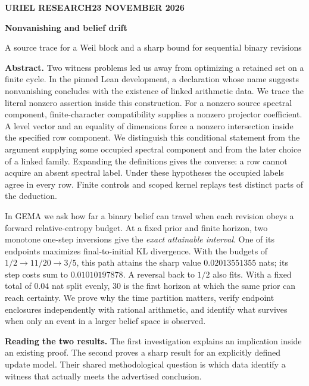 \documentclass[12pt,letterpaper]{article}
\begin{document}
\thispagestyle{plain}
{\sffamily\small\bfseries\color{accent}URIEL RESEARCH\hfill 23 NOVEMBER 2026}\par\vspace{12pt}
{\Huge\bfseries\color{ink}Nonvanishing and belief drift\par}\vspace{4pt}
{\Large\color{muted}A source trace for a Weil block and a sharp bound for sequential binary revisions\par}\vspace{13pt}
\textbf{Abstract.} Two witness problems led us away from optimizing a retained set on a finite cycle. In the pinned Lean development, a declaration whose name suggests nonvanishing concludes with the existence of linked arithmetic data. We trace the literal nonzero assertion inside this construction. For a nonzero source spectral component, finite-character compatibility supplies a nonzero projector coefficient. A level vector and an equality of dimensions force a nonzero intersection inside the specified row component. We distinguish this conditional statement from the argument supplying some occupied spectral component and from the later choice of a linked family. Expanding the definitions gives the converse: a row cannot acquire an absent spectral label. Under these hypotheses the occupied labels agree in every row. Finite controls and scoped kernel replays test distinct parts of the deduction.

In GEMA we ask how far a binary belief can travel when each revision obeys a forward relative-entropy budget. At a fixed prior and finite horizon, two monotone one-step inversions give the \emph{exact attainable interval}. One of its endpoints maximizes final-to-initial KL divergence. With the budgets of \(1/2\to11/20\to3/5\), this path attains the sharp value \(0.02013551355\) nats; its step costs sum to \(0.01010197878\). A reversal back to \(1/2\) also fits. With a fixed total of \(0.04\) nat split evenly, \(30\) is the first horizon at which the same prior can reach certainty. We prove why the time partition matters, verify endpoint enclosures independently with rational arithmetic, and identify what survives when only an event in a larger belief space is observed.

\medskip\textbf{Reading the two results.} The first investigation explains an implication inside an existing proof. The second proves a sharp result for an explicitly defined update model. Their shared methodological question is which data identify a witness that actually meets the advertised conclusion.
\clearpage
\tableofcontents
\clearpage
\end{document}
